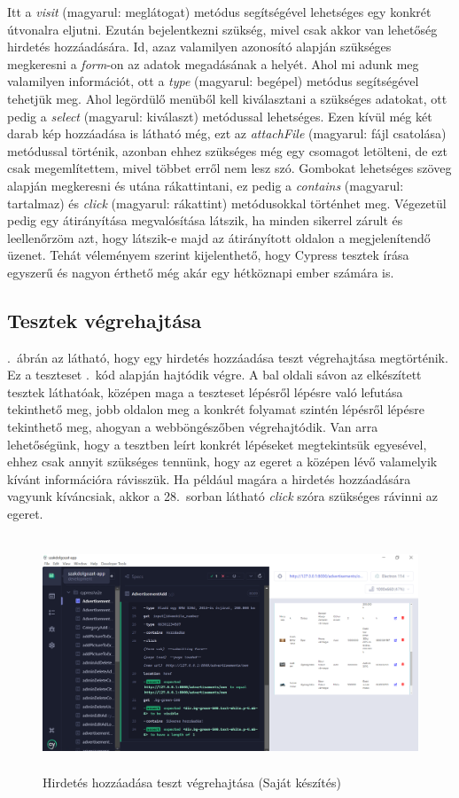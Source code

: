 \documentclass[]{thesis-ekf}
\theoremstyle{definition}
\theoremstyle{remark}
\begin{document}
		
		
		Itt a \emph{visit} (magyarul: meglátogat) metódus segítségével lehetséges egy konkrét útvonalra eljutni. Ezután bejelentkezni szükség, mivel csak akkor van lehetőség hirdetés hozzáadására. Id, azaz valamilyen azonosító alapján szükséges megkeresni a \emph{form}-on az adatok megadásának a helyét. Ahol mi adunk meg valamilyen információt, ott a \emph{type} (magyarul: begépel) metódus segítségével tehetjük meg. Ahol legördülő menüből kell kiválasztani a szükséges adatokat, ott pedig a \emph{select} (magyarul: kiválaszt) metódussal lehetséges. Ezen kívül még két darab kép hozzáadása is látható még, ezt az \emph{attachFile} (magyarul: fájl csatolása) metódussal történik, azonban ehhez szükséges még egy csomagot letölteni, de ezt csak megemlítettem, mivel többet erről nem lesz szó. Gombokat lehetséges szöveg alapján megkeresni és utána rákattintani, ez pedig a \emph{contains} (magyarul: tartalmaz) és \emph{click} (magyarul: rákattint) metódusokkal történhet meg. Végezetül pedig egy átirányítása megvalósítása látszik, ha minden sikerrel zárult és leellenőrzöm azt, hogy látszik-e majd az átirányított oldalon a megjelenítendő üzenet. Tehát véleményem szerint kijelenthető, hogy Cypress tesztek írása egyszerű és nagyon érthető még akár egy hétköznapi ember számára is.
	\subsection{Tesztek végrehajtása}
		.~ábrán az látható, hogy egy hirdetés hozzáadása teszt végrehajtása megtörténik. Ez a teszteset .~kód alapján hajtódik végre. A bal oldali sávon az elkészített tesztek láthatóak, középen maga a teszteset lépésről lépésre való lefutása tekinthető meg, jobb oldalon meg a konkrét folyamat szintén lépésről lépésre tekinthető meg, ahogyan a webböngészőben végrehajtódik. Van arra lehetőségünk, hogy a tesztben leírt konkrét lépéseket megtekintsük egyesével, ehhez csak annyit szükséges tennünk, hogy az egeret a középen lévő valamelyik kívánt információra rávisszük. Ha például magára a hirdetés hozzáadására vagyunk kíváncsiak, akkor a 28.~sorban látható \emph{click} szóra szükséges rávinni az egeret.
		\begin{figure}[ht!]
			\centering
			\includegraphics[height=7cm]{./teszteles/teszt}
			\caption{Hirdetés hozzáadása teszt végrehajtása (Saját készítés)} 
			\label{teszt-vegrehajtasa}
		\end{figure}
		
\end{document}
